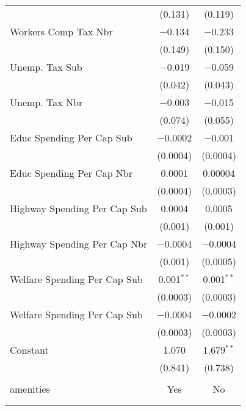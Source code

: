 \begin{table}[!htbp]
\begin{tabular}{@{\extracolsep{5pt}}lcc}
  & (0.131) & (0.119) \\ 
  Workers Comp Tax Nbr & $-$0.134 & $-$0.233 \\ 
  & (0.149) & (0.150) \\ 
  Unemp. Tax Sub & $-$0.019 & $-$0.059 \\ 
  & (0.042) & (0.043) \\ 
  Unemp. Tax Nbr & $-$0.003 & $-$0.015 \\ 
  & (0.074) & (0.055) \\ 
  Educ Spending Per Cap Sub & $-$0.0002 & $-$0.001 \\ 
  & (0.0004) & (0.0004) \\ 
  Educ Spending Per Cap Nbr & 0.0001 & 0.00004 \\ 
  & (0.0004) & (0.0003) \\ 
  Highway Spending Per Cap Sub & 0.0004 & 0.0005 \\ 
  & (0.001) & (0.001) \\ 
  Highway Spending Per Cap Nbr & $-$0.0004 & $-$0.0004 \\ 
  & (0.001) & (0.0005) \\ 
  Welfare Spending Per Cap Sub & 0.001$^{**}$ & 0.001$^{**}$ \\ 
  & (0.0003) & (0.0003) \\ 
  Welfare Spending Per Cap Sub & $-$0.0004 & $-$0.0002 \\ 
  & (0.0003) & (0.0003) \\ 
  Constant & 1.070 & 1.679$^{**}$ \\ 
  & (0.841) & (0.738) \\ 
 \hline \\[-1.8ex] 
amenities & Yes & No \\ 
\hline \\[-1.8ex] 
\hline 
\hline \\[-1.8ex] 
\end{tabular} 
\end{table} 
